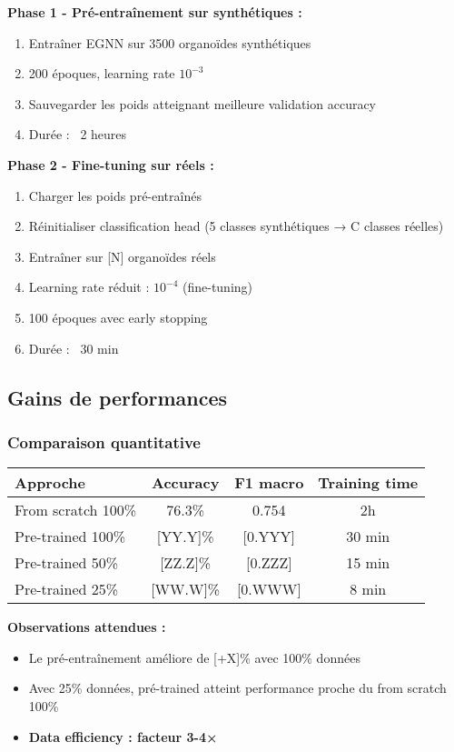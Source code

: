 \textbf{Phase 1 - Pré-entraînement sur synthétiques :}
\begin{enumerate}
    \item Entraîner EGNN sur 3500 organoïdes synthétiques
    \item 200 époques, learning rate $10^{-3}$
    \item Sauvegarder les poids atteignant meilleure validation accuracy
    \item Durée : ~2 heures
\end{enumerate}

\textbf{Phase 2 - Fine-tuning sur réels :}
\begin{enumerate}
    \item Charger les poids pré-entraînés
    \item Réinitialiser classification head (5 classes synthétiques → C classes réelles)
    \item Entraîner sur [N] organoïdes réels
    \item Learning rate réduit : $10^{-4}$ (fine-tuning)
    \item 100 époques avec early stopping
    \item Durée : ~30 min
\end{enumerate}

\subsection{Gains de performances}

\subsubsection{Comparaison quantitative}

\begin{center}
\begin{tabular}{|l|c|c|c|}
\hline
\textbf{Approche} & \textbf{Accuracy} & \textbf{F1 macro} & \textbf{Training time} \\
\hline
From scratch 100\% & 76.3\% & 0.754 & 2h \\
Pre-trained 100\% & [YY.Y]\% & [0.YYY] & 30 min \\
Pre-trained 50\% & [ZZ.Z]\% & [0.ZZZ] & 15 min \\
Pre-trained 25\% & [WW.W]\% & [0.WWW] & 8 min \\
\hline
\end{tabular}
\end{center}

\textbf{Observations attendues :}
\begin{itemize}
    \item Le pré-entraînement améliore de [+X]\% avec 100\% données
    \item Avec 25\% données, pré-trained atteint performance proche du from scratch 100\%
    \item \textbf{Data efficiency : facteur 3-4×}
\end{itemize}

